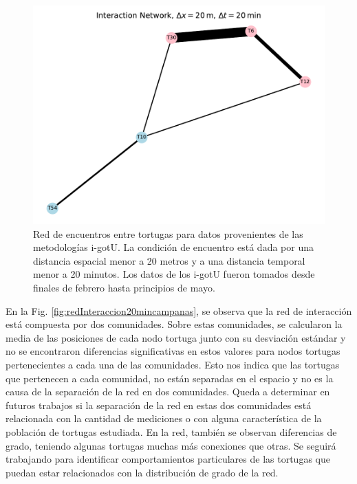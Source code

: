 \begin{figure}[ht]
    \begin{center}
       
   
    \includegraphics[width=\imsize]{Chap2/red_interaccion_20min_IGOTO.pdf}
\end{center}
    \caption[Red de encuentros entre tortugas utilizando i-gotU.]{Red de encuentros entre tortugas para datos provenientes de las metodologías i-gotU. La condición de encuentro está dada por una distancia espacial menor a 20 metros y a una distancia temporal menor a 20 minutos. Los datos de los i-gotU fueron tomados desde finales de febrero hasta principios de mayo.}
    \label{fig:redInteraccion20igotu}
\end{figure}
 
 
En la Fig. \ref{fig:redInteraccion20mincampanas}, se observa que la red de interacción está compuesta por dos comunidades. Sobre estas comunidades, se calcularon la media de las posiciones de cada nodo tortuga junto con su desviación estándar y no se encontraron diferencias significativas en estos valores para  nodos tortugas pertenecientes a cada una de las comunidades. Esto nos indica que las tortugas que pertenecen a cada comunidad, no están separadas en el espacio y no es la causa de la separación de la red en dos comunidades. Queda a determinar en futuros trabajos si la separación de la red en estas dos comunidades está relacionada con la cantidad de  mediciones o con alguna característica de la población de tortugas estudiada. En la red, también se observan diferencias  de grado, teniendo algunas tortugas muchas más conexiones que otras. Se seguirá trabajando para identificar comportamientos particulares de las tortugas que puedan estar relacionados con la distribución de grado de la red.
 
